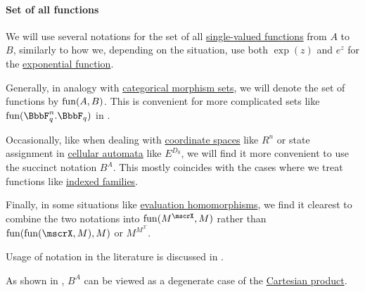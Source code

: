\paragraph{Set of all functions}

\begin{definition}\label{rem:set_of_all_functions}\mimprovised
  We will use several notations for the set of all \hyperref[def:function]{single-valued functions} from \( A \) to \( B \), similarly to how we, depending on the situation, use both \( \exp(z) \) and \( e^z \) for the \hyperref[def:exponential_function]{exponential function}.

  Generally, in analogy with \hyperref[def:category/morphisms]{categorical morphism sets}, we will denote the set of functions by \( \operatorname{fun}(A, B) \). This is convenient for more complicated sets like \( \fun(\BbbF_q^n. \BbbF_q) \) in .

  Occasionally, like when dealing with \hyperref[def:coordinate_space]{coordinate spaces} like \( R^n \) or state assignment in \hyperref[def:cellular_automaton]{cellular automata} like \( E^{D_0} \), we will find it more convenient to use the succinct notation \( B^A \). This mostly coincides with the cases where we treat functions like \hyperref[def:indexed_family]{indexed families}.

  Finally, in some situations like \hyperref[con:evaluation_homomorphism]{evaluation homomorphisms}, we find it clearest to combine the two notations into \( \fun(M^\mscrX, M) \) rather than \( \fun(\fun(\mscrX, M), M) \) or \( M^{M^\mscrX} \).
\end{definition}
\begin{comments}
  \item Usage of notation in the literature is discussed in .

  \item As shown in , \( B^A \) can be viewed as a degenerate case of the \hyperref[def:cartesian_product]{Cartesian product}.
\end{comments}

